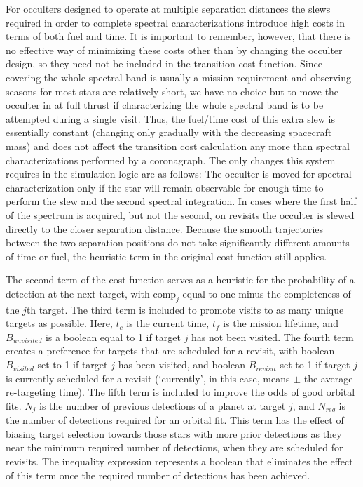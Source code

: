 For occulters designed to operate at multiple separation distances the slews required in order to complete spectral characterizations introduce high costs in terms of both fuel and time.  It is important to remember, however, that there is no effective way of minimizing these costs other than by changing the occulter design, so they need not be included in the transition cost function.  Since covering the whole spectral band is usually a mission requirement and observing seasons for most stars are relatively short, we have no choice but to move the occulter in at full thrust if characterizing the whole spectral band is to be attempted during a single visit.  Thus, the fuel/time cost of this extra slew is essentially constant (changing only gradually with the decreasing spacecraft mass) and does not affect the transition cost calculation any more than spectral characterizations performed by a coronagraph.  The only changes this system requires in the simulation logic are as follows: The occulter is moved for spectral characterization only if the star will remain observable for enough time to perform the slew and the second spectral integration.  In cases where the first half of the spectrum is acquired, but not the second, on revisits the occulter is slewed directly to the closer separation distance.  Because the smooth trajectories between the two separation positions do not take significantly different amounts of time or fuel, the heuristic term in the original cost function still applies.

The second term of the cost function serves as a heuristic for the probability of a detection at the next target, with  $\textrm{comp}_j$ equal to one minus the completeness of the $j$th target.  The third term is included to promote visits to as many unique targets as possible.  Here,  $t_c$ is the current time, $t_f$ is the mission lifetime, and $B_{unvisited}$ is a boolean equal to 1 if target $j$ has not been visited.  The fourth term creates a preference for targets that are scheduled for a revisit, with boolean $B_{visited}$  set to 1 if target $j$ has been visited, and boolean $B_{revisit}$ set to 1 if target $j$ is currently scheduled for a revisit (`currently', in this case, means $\pm$ the average re-targeting time).  The fifth term is included to improve the odds of good orbital fits.  $N_j$ is the number of previous detections of a planet at target $j$, and $N_{req}$ is the number of detections required for an orbital fit.  This term has the effect of biasing target selection towards those stars with more prior detections as they near the minimum required number of detections, when they are scheduled for revisits.  The inequality expression represents a boolean that eliminates the effect of this term once the required number of detections has been achieved.  

